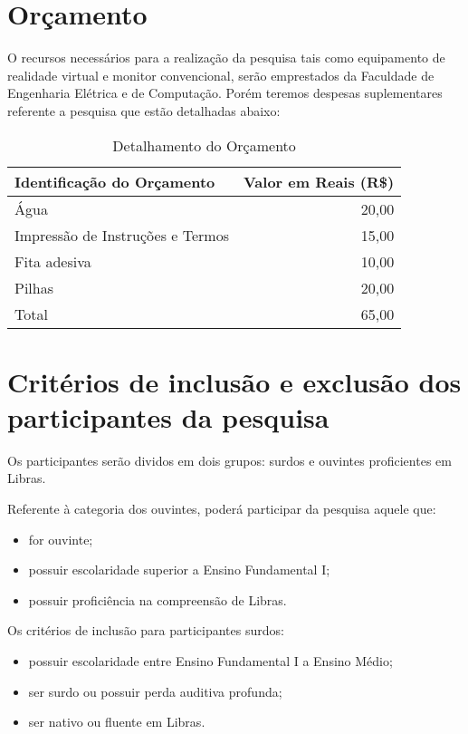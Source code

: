 \documentclass[a4paper,11pt,titlepage,singlespacing]{article}
\begin{document}
\section{Orçamento}
O recursos necessários para a realização da pesquisa tais como equipamento de realidade virtual e monitor convencional, serão emprestados da Faculdade de Engenharia Elétrica e de Computação.
Porém teremos despesas suplementares referente a pesquisa que estão detalhadas abaixo:

\begin{table}[h]
\caption{Detalhamento do Orçamento}
\centering
\vspace{0.5cm}
\begin{tabular}{l|r}
Identificação do Orçamento & Valor em Reais (R\$) \\
\hline 
Água        & 20,00 \\
Impressão de Instruções e Termos  & 15,00 \\
Fita adesiva & 10,00 \\
Pilhas & 20,00 \\
\hline 
Total & 65,00
\end{tabular}
\end{table}

\section{Critérios de inclusão e exclusão dos participantes da pesquisa}

Os participantes serão dividos em dois grupos: surdos e ouvintes proficientes em Libras.

Referente à categoria dos ouvintes, poderá participar da pesquisa aquele que:

\begin{itemize}
\item for ouvinte;
\item possuir escolaridade superior a Ensino Fundamental I;
\item possuir proficiência na compreensão de Libras.
\end{itemize}

Os critérios de inclusão para participantes surdos:

\begin{itemize}
\item possuir escolaridade entre Ensino Fundamental I a Ensino Médio;
\item ser surdo ou possuir perda auditiva profunda;
\item ser nativo ou fluente em Libras.
\end{itemize}
\end{document}

